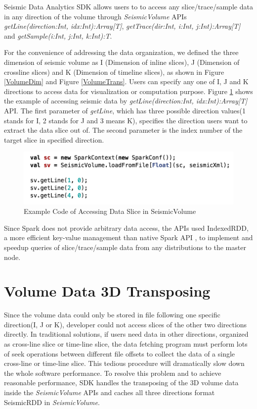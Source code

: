 Seismic Data Analytics SDK allows users to to access any slice/trace/sample data in any direction of the volume through \emph{SeismicVolume} APIs \emph{getLine(direction:Int, idx:Int):Array[T]}, \emph{getTrace(dir:Int, i:Int, j:Int):Array[T]} and \emph{getSample(i:Int, j:Int, k:Int):T}. 

For the convenience of addressing the data organization, we defined the three dimension of seismic volume as I (Dimension of inline slices), J (Dimension of crossline slices) and K (Dimension of timeline slices), as shown in Figure \ref{VolumeDim} and Figure \ref{VolumeTrans}. Users can specify any one of I, J and K directions to access data for visualization or computation purpose.  Figure \ref{code_load_access} shows the example of accessing seismic data by \emph{getLine(direction:Int, idx:Int):Array[T]} API. The first parameter of \emph{getLine}, which has three possible direction values(1 stands for I, 2 stands for J and 3 means K), specifies the direction users want to extract the data slice out of.  The second parameter is the index number of the target slice in specified direction.

\begin{figure}[h]
\centering
\includegraphics[scale=0.8]{figures/code_load_access.png}
\caption{Example Code of Accessing Data Slice in SeismicVolume}
\label{code_load_access}
\end{figure}


Since Spark does not provide arbitrary data access, the APIs used IndexedRDD, a more efficient key-value management than native Spark API \cite{IndexedRDD}, to implement and speedup queries of slice/trace/sample data from any distributions to the master node.


\section{Volume Data 3D Transposing}

Since the volume data could only be stored in file following one specific direction(I, J or K), developer could not access slices of the other two directions directly. In traditional solutions, if users need data in other directions, organized as cross-line slice or time-line slice, the data fetching program must perform lots of seek operations between different file offsets to collect the data of a single cross-line or time-line slice. This tedious procedure will dramatically slow down the whole software performance. To resolve this problem and to achieve reasonable performance, SDK handles the transposing of the 3D volume data inside the \emph{SeismicVolume} APIs and caches all three directions format SeismicRDD in \emph{SeismicVolume}.


